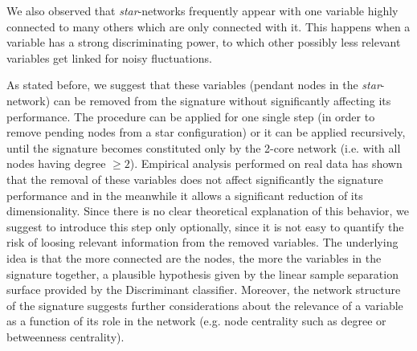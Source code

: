 \documentclass{standalone}
\begin{document}
We also observed that \emph{star}-networks frequently appear with one variable highly connected to many others which are only connected with it.
This happens when a variable has a strong discriminating power, to which other possibly less relevant variables get linked for noisy fluctuations.

As stated before, we suggest that these variables (pendant nodes in the \emph{star}-network) can be removed from the signature without significantly affecting its performance.
The procedure can be applied for one single step (in order to remove pending nodes from a star configuration) or it can be applied recursively, until the signature becomes constituted only by the 2-core network (i.e. with all nodes having degree $\geq2$).
Empirical analysis performed on real data has shown that the removal of these variables does not affect significantly the signature performance and in the meanwhile it allows a significant reduction of its dimensionality.
Since there is no clear theoretical explanation of this behavior, we suggest to introduce this step only optionally, since it is not easy to quantify the risk of loosing relevant information from the removed variables.
The underlying idea is that the more connected are the nodes, the more the variables in the signature  together, a plausible hypothesis given by the linear sample separation surface provided by the Discriminant classifier.
Moreover, the network structure of the signature suggests further considerations about the relevance of a variable as a function of its role in the network (e.g. node centrality such as degree or betweenness centrality).
\end{document}
